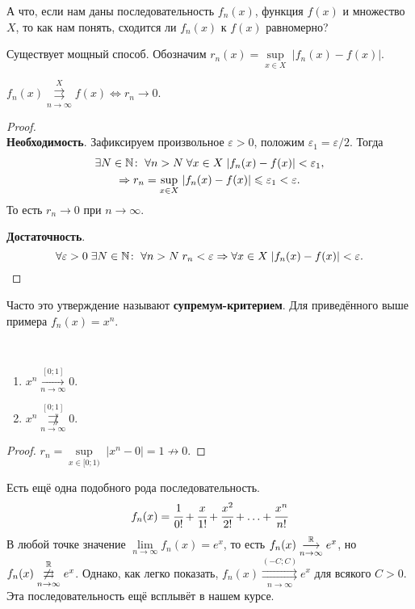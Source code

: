 \documentclass[a4paper, 12pt]{article}
\begin{document}
	А что, если нам даны последовательность $f_n(x)$, функция $f(x)$ и множество $X$, то как нам понять, сходится ли $f_n(x)$ к $f(x)$ равномерно?
	
	Существует мощный способ. Обозначим $r_n(x) =\underset{x \in X}{\sup}\;|f_n(x) - f(x)|$.
	\begin{Statement}
		$f_n(x)\overset{X}{\underset{n\to\infty}{\rightrightarrows}} f(x) \Leftrightarrow r_n\to 0$.
	\end{Statement}
	\begin{proof}\ \\
		\textbf{Необходимость}. Зафиксируем произвольное $\varepsilon > 0$, положим $\varepsilon_1 = \varepsilon/2$. Тогда
		\begin{gather*}
			\exists N\in \mathbb{N} \colon\; \forall n>N\; \forall x \in X\; |f_n(x) - f(x)| < \varepsilon_1,\\
			\Rightarrow r_n =  \underset{x \in X}{\sup}\; |f_n(x) - f(x)| \leqslant \varepsilon_1 < \varepsilon.
		\end{gather*}
		То есть $r_n \to 0$ при $n\to \infty$.
		\par \textbf{Достаточность}.
		$$
		\forall \varepsilon > 0\; \exists N \in \mathbb{N}\colon \; \forall n>N\; r_n < \varepsilon \Rightarrow \forall x \in X\; |f_n(x) - f(x)| < \varepsilon.
		$$
	\end{proof}
	Часто это утверждение называют \textbf{супремум-критерием}. Для приведённого выше примера $f_n(x) = x^n$.
	\begin{Statement}\ \\		
		\begin{enumerate}
			\item $x^n \overset{[0;1]}{\underset{n\to\infty}{\longrightarrow}} 0$.
			\item $x^n \overset{[0;1]}{\underset{n\to\infty}{\not\rightrightarrows}} 0$.
		\end{enumerate}
	\end{Statement}
	\begin{proof}
		$r_n = \underset{x\in[0;1)}{\sup}\;|x^n - 0| = 1 \not\to 0$.
	\end{proof}
	Есть ещё одна подобного рода последовательность.
	$$
		f_n(x) = \cfrac{1}{0!} + \cfrac{x}{1!} + \cfrac{x^2}{2!} + \ldots + \cfrac{x^n}{n!}
	$$
	В любой точке значение $\lim\limits_{n \to \infty} f_n(x) = e^x$, то есть 	$f_n(x) \overset{\mathbb{R}}{\underset{n\to\infty}{\longrightarrow}} e^x$, но $f_n(x) \overset{\mathbb{R}}{\underset{n\to\infty}{\not\rightrightarrows}} e^x$. Однако, как легко показать, $f_n(x) \overset{(-C;C)}{\underset{n\to\infty}{\rightrightarrows}} e^x$ для всякого $C>0$. Эта последовательность ещё всплывёт в нашем курсе.
\end{document}
